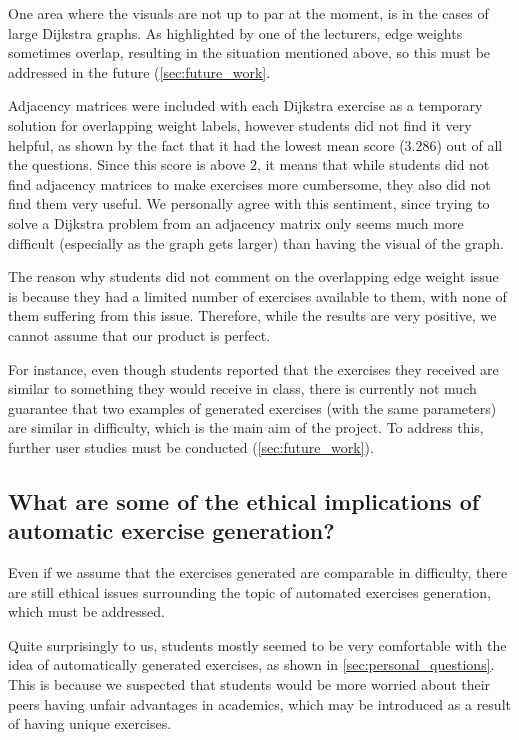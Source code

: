 \documentclass{l4proj}
\begin{document}
One area where the visuals are not up to par at the moment, is in the cases of large Dijkstra graphs. As highlighted by one of the lecturers, edge weights sometimes overlap, resulting in the situation mentioned above, so this must be addressed in the future (\autoref{sec:future_work}. 

Adjacency matrices were included with each Dijkstra exercise as a temporary solution for overlapping weight labels, however students did not find it very helpful, as shown by the fact that it had the lowest mean score ($3.286$) out of all the questions. Since this score is above $2$, it means that while students did not find adjacency matrices to make exercises more cumbersome, they also did not find them very useful. We personally agree with this sentiment, since trying to solve a Dijkstra problem from an adjacency matrix only seems much more difficult (especially as the graph gets larger) than having the visual of the graph.

The reason why students did not comment on the overlapping edge weight issue is because they had a limited number of exercises available to them, with none of them suffering from this issue. Therefore, while the results are very positive, we cannot assume that our product is perfect.

For instance, even though students reported that the exercises they received are similar to something they would receive in class, there is currently not much guarantee that two examples of generated exercises (with the same parameters) are similar in difficulty, which is the main aim of the project. To address this, further user studies must be conducted (\autoref{sec:future_work}).

\subsection{What are some of the ethical implications of automatic exercise generation?}

Even if we assume that the exercises generated are comparable in difficulty, there are still ethical issues surrounding the topic of automated exercises generation, which must be addressed.

Quite surprisingly to us, students mostly seemed to be very comfortable with the idea of automatically generated exercises, as shown in \autoref{sec:personal_questions}. This is because we suspected that students would be more worried about their peers having unfair advantages in academics, which may be introduced as a result of having unique exercises. 
\end{document}
